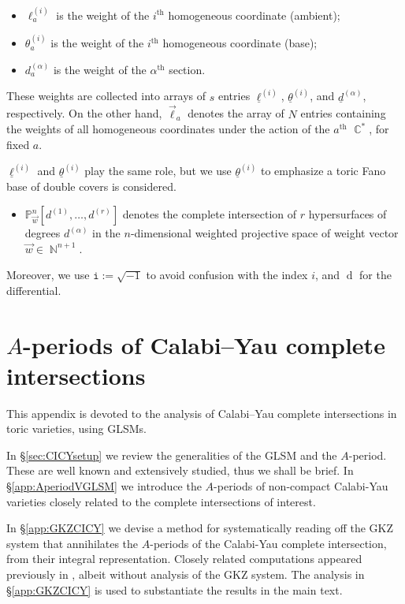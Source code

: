 \documentclass[12pt,a4paper,oneside]{amsart}
\numberwithin{equation}{section}
\theoremstyle{definition}
\theoremstyle{remark}
\DeclareMathOperator{\C}{\mathbb{C}}
\DeclareMathOperator{\N}{\mathbb{N}}
\DeclareMathOperator{\dd}{d}
\newcommand{\cP}{\mathbb{P}}
\newcommand{\ii}{\mathtt{i}}
\begin{document}
\begin{appendix}
\begin{itemize}
	\item $\ell_a ^{(i)}$ is the weight of the $i^\text{th}$ homogeneous coordinate (ambient);
	\item $\theta_a ^{(i)}$ is the weight of the $i^\text{th}$ homogeneous coordinate (base);
	\item $d_a ^{(\alpha)}$ is the weight of the $\alpha^\text{th}$ section.
\end{itemize}
These weights are collected into arrays of $s$ entries $\underline{\ell}^{(i)}$, $\underline{\theta}^{(i)}$, and $\underline{d}^{(\alpha)}$, respectively. On the other hand, $\vec{\ell}_a$ denotes the array of $N$ entries containing the weights of all homogeneous coordinates under the action of the $a^{\text{th}}$ $\C^{\ast}$, for fixed $a$.\par
$\underline{\ell}^{(i)}$ and $\underline{\theta}^{(i)}$ play the same role, but we use $\underline{\theta}^{(i)}$ to emphasize a toric Fano base of double covers is considered.\par
\begin{itemize}
    \item $\cP^{n}_{\vec{w}} [d^{(1)}, \dots, d^{(r)}]$ denotes the complete intersection of $r$ hypersurfaces of degrees $d^{(\alpha)}$ in the $n$-dimensional weighted projective space of weight vector $\vec{w} \in \N^{n+1}$.
\end{itemize}
Moreover, we use $\ii:= \sqrt{-1}$ to avoid confusion with the index $i$, and $\dd$ for the differential.\par






\section{\texorpdfstring{$A$}{A}-periods of Calabi--Yau complete intersections}
\label{app:CICYperiod}

This appendix is devoted to the analysis of Calabi--Yau complete intersections in toric varieties, using GLSMs.\par
In \S\ref{sec:CICYsetup} we review the generalities of the GLSM and the $A$-period. These are well known and extensively studied, thus we shall be brief. In \S\ref{app:AperiodVGLSM} we introduce the $A$-periods of non-compact Calabi-Yau varieties closely related to the complete intersections of interest.\par 
In \S\ref{app:GKZCICY} we devise a method for systematically reading off the GKZ system that annihilates the $A$-periods of the Calabi-Yau complete intersection, from their integral representation. Closely related computations appeared previously in \cite{Gu:2020ana}, albeit without analysis of the GKZ system. The analysis in \S\ref{app:GKZCICY} is used to substantiate the results in the main text.



\end{appendix}
\end{document}
